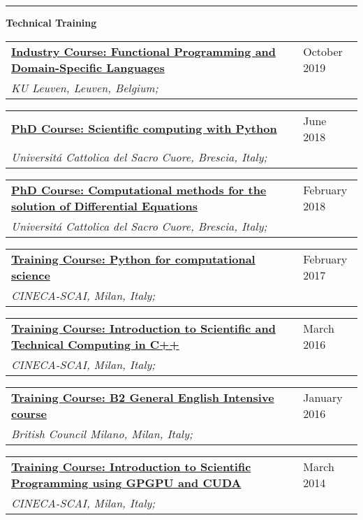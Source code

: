 \documentclass[a4paper]{article}
\newcommand{\block}[1]{\hrule \vspace{0.2cm} \textbf{\Large #1} \vspace{0.2cm}}
\newcommand{\longvoice}[8]{
    \begin{tabular}{p{0.83\linewidth} p{0.17\linewidth} }
        \textbf{\href{#3}{#2: #1}} & #4 
        \\ 
        \textit{#5, #6, #7;} & {\small\emph{#8}}
    \end{tabular}
    \vspace{.5em}
    }
\begin{document}
\clearpage

    \block{Technical Training}
   
    \longvoice{Functional Programming and Domain-Specific Languages}
        {Industry Course}
        {https://dtai.cs.kuleuven.be/events/fpcourse/}
        {October 2019}
        {KU Leuven}
        {Leuven}
        {Belgium}
        {}
    \longvoice{Scientific computing with Python}
        {PhD Course}
        {https://web.archive.org/web/20180604081514/http://dmf.unicatt.it/~della/pythoncourse18/}
        {June 2018}
        {Universit\'a Cattolica del Sacro Cuore}
        {Brescia}
        {Italy}
        {}
    \longvoice{Computational methods for the solution of Differential Equations}
        {PhD Course}
        {https://www.dropbox.com/s/q2rapau2k49n5t7/1802-Course-NumericalPdeAvella.pdf?dl=0}
        {February 2018}
        {Universit\'a Cattolica del Sacro Cuore}
        {Brescia}
        {Italy}
        {}
    \longvoice{Python for computational science}
        {Training Course}
        {https://web.archive.org/web/20170623170252/https://eventi.cineca.it/en/hpc/python-computational-science}
        {February 2017}
        {CINECA-SCAI}
        {Milan}
        {Italy}
        {}
    \longvoice{Introduction to Scientific and Technical Computing in C++}
        {Training Course}
        {https://web.archive.org/save/http://www.hpc.cineca.it/content/introduction-object-oriented}
        {March 2016}
        {CINECA-SCAI}
        {Milan}
        {Italy}
        {}
    \longvoice{B2 General English Intensive course}
        {Training Course}
        {https://www.britishcouncil.it/en/english/courses-adults/general}
        {January 2016}
        {British Council Milano}
        {Milan}
        {Italy}
        {}
    \longvoice{Introduction to Scientific Programming using GPGPU and CUDA}
        {Training Course}
        {https://web.archive.org/web/20170623171128/http://www.hpc.cineca.it/content/introduction-to-gpu}
        {March 2014}
        {CINECA-SCAI}
        {Milan}
        {Italy}
        {}
    
\end{document}
